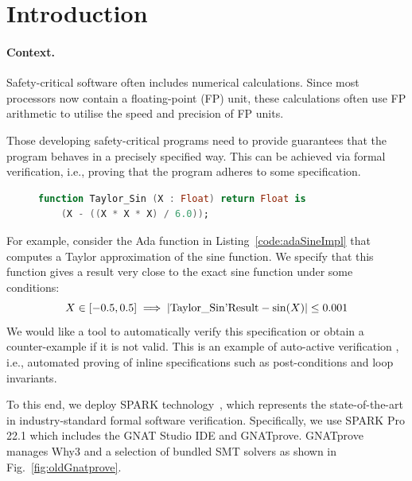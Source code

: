 \documentclass[runningheads]{llncs}
\begin{document}
\section{Introduction}
\label{sec:introduction}
\paragraph{Context.}
Safety-critical software often includes numerical calculations.
Since most processors now contain a floating-point (FP) unit, these calculations often use FP arithmetic to utilise the speed and precision of FP units.

Those developing safety-critical programs need to provide guarantees that the program behaves in a precisely specified way.
This can be achieved via formal verification, i.e., proving that the program adheres to some specification.

\begin{figure}[tb]
  \begin{lstlisting}[caption=Sine function in Ada, language=ada, label={code:adaSineImpl}]
  function Taylor_Sin (X : Float) return Float is
    (X - ((X * X * X) / 6.0));
  \end{lstlisting}
\end{figure}

For example, consider the Ada function in Listing~\ref{code:adaSineImpl} that computes a Taylor approximation of the sine function.
We specify that this function gives a result very close to the exact sine function under some conditions:
\begin{equation}\label{eq:taylor-sine-informal-spec}
  X \in [-0.5, 0.5] \implies
  |\text{\lstinline{Taylor_Sin'Result}}-\sin(X)| \leq 0.001
\end{equation}
We would like a tool to automatically verify this specification or obtain a counter-example if it is not valid.
This is an example of auto-active verification \cite{leino2010auto-active}, i.e., automated proving of inline specifications such as post-conditions and loop invariants.

To this end, we deploy SPARK technology~\cite{hoang_spark_2015}, which represents the state-of-the-art in industry-standard formal software verification.
Specifically, we use SPARK Pro 22.1 which includes the GNAT Studio IDE and GNATprove.
GNATprove manages Why3 and a selection of bundled SMT solvers as shown in Fig.~\ref{fig:oldGnatprove}. 

\end{document}
